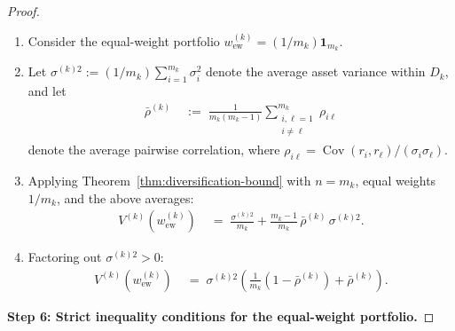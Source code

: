 \documentclass[12pt,openany]{book}
\newcommand{\bfw}{\mathbf{w}}
\newcommand{\bfone}{\mathbf{1}}
\newcommand{\calD}{\mathcal{D}}
\DeclareMathOperator{\Cov}{Cov}
\numberwithin{equation}{chapter}
\theoremstyle{plain}
\theoremstyle{definition}
\theoremstyle{remark}
\def\calD{D}%
\def\mathcal#1{#1}%
\def\bfw{w}%
\begin{document}
\begin{proof}
\begin{enumerate}
  \item Consider the equal-weight portfolio
        $\bfw^{(k)}_{\mathrm{ew}} = (1/m_k)\bfone_{m_k}$.
  \item Let $\sigma^{(k)2} := (1/m_k)\sum_{i=1}^{m_k}\sigma_i^2$
        denote the average asset variance within $\calD_k$, and let
        \begin{align}
          \bar{\rho}^{(k)}
          &\;:=\; \frac{1}{m_k(m_k-1)}
                  \sum_{\substack{i,\ell=1\\i\neq\ell}}^{m_k}
                  \rho_{i\ell}
        \end{align}
        denote the average pairwise correlation, where
        $\rho_{i\ell} = \Cov(r_i,r_\ell)/(\sigma_i\sigma_\ell)$.
  \item Applying Theorem~\ref{thm:diversification-bound} with
        $n = m_k$, equal weights $1/m_k$, and the above averages:
        \begin{align}
          V^{(k)}(\bfw^{(k)}_{\mathrm{ew}})
          &\;=\; \frac{\sigma^{(k)2}}{m_k}
                 + \frac{m_k - 1}{m_k}\,\bar{\rho}^{(k)}\,\sigma^{(k)2}.
          \label{eq:ew-var}
        \end{align}
  \item Factoring out $\sigma^{(k)2} > 0$:
        \begin{align}
          V^{(k)}(\bfw^{(k)}_{\mathrm{ew}})
          &\;=\; \sigma^{(k)2}
                 \left(\frac{1}{m_k}(1 - \bar{\rho}^{(k)})
                        + \bar{\rho}^{(k)}\right).
          \label{eq:ew-var-factor}
        \end{align}
\end{enumerate}

\medskip
\noindent\textbf{Step 6: Strict inequality conditions for the
equal-weight portfolio.}


\end{proof}
\end{document}
